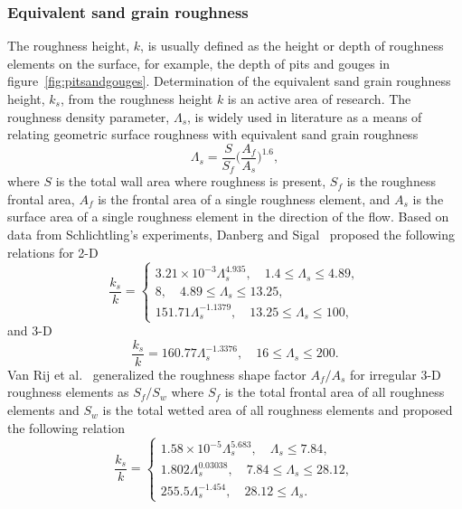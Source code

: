 \subsubsection{Equivalent sand grain roughness}\label{ssec:eqks}
The roughness height, $k$, is usually defined as the height or depth of roughness elements on the surface, for example, the depth of pits and gouges in figure~\ref{fig:pitsandgouges}. Determination of the equivalent sand grain roughness height, $k_s$, from the roughness height $k$ is an active area of research. The roughness density parameter, $\Lambda_s$, is widely used in literature as a means of relating geometric surface roughness with equivalent sand grain roughness
\begin{equation}
 \Lambda_s = \frac{S}{S_f}\Bigg(\frac{A_f}{A_s}\Bigg)^{1.6},
\end{equation}
where $S$ is the total wall area where roughness is present, $S_f$ is the roughness frontal area, $A_f$ is the frontal area of a single roughness element, and $A_s$ is the surface area of a single roughness element in the direction of the flow. Based on data from Schlichtling's experiments, Danberg and Sigal~\cite{danberg1988analysis} proposed the following relations for 2-D 
\begin{equation}
\frac{k_s}{k} = \begin{cases}
3.21\times10^{-3}\Lambda_s^{4.935},\quad1.4\leq \Lambda_s\leq 4.89,\\
8,\quad 4.89\leq \Lambda_s\leq 13.25,\\
151.71\Lambda_s^{-1.1379},\quad 13.25 \leq \Lambda_s\leq 100,
\end{cases}
\end{equation}
and 3-D
\begin{equation}
\frac{k_s}{k} = 160.77\Lambda_s^{-1.3376},\quad 16 \leq \Lambda_s\leq 200.
\end{equation}
Van Rij et al.~\cite{van2002analysis} generalized the roughness shape factor $A_f/A_s$ for irregular 3-D roughness elements as $S_f/S_w$ where $S_f$ is the total frontal area of all roughness elements and $S_w$ is the total wetted area of all roughness elements and proposed the following relation
\begin{equation}
\frac{k_s}{k} = \begin{cases}
1.58\times10^{-5}\Lambda_s^{5.683},\quad \Lambda_s\leq 7.84,\\
1.802\Lambda_s^{0.03038},\quad 7.84\leq \Lambda_s\leq 28.12,\\
255.5\Lambda_s^{-1.454},\quad 28.12 \leq \Lambda_s.
\end{cases}
\end{equation} 
